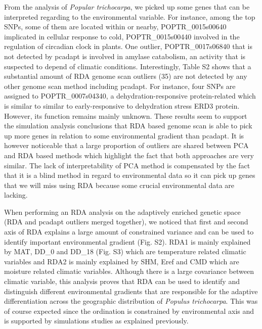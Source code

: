 \documentclass[nogrid]{MBE}%
\begin{document}
From the analysis of \textit{Popular trichocarpa}, we picked up some genes that can be interpreted regarding to the environmental variable. For instance, among the top SNPs, some of them are located within or nearby, POPTR\_0015s00640 implicated in cellular response to cold, POPTR\_0015s00440 involved in the regulation of circadian clock in plants. One outlier, POPTR\_0017s06840 that is not detected by pcadapt is involved in amylase catabolism, an activity that is suspected to depend of climatic conditions. Interestingly, Table S2 shows that a substantial amount of RDA genome scan outliers (35) are not detected by any other genome scan method including pcadapt. For instance, four SNPs are assigned to POPTR\_0007s04340, a dehydration-responsive protein-related which is similar to similar to early-responsive to dehydration stress ERD3 protein. However, its function remains mainly unknown. These results seem to support the simulation analysis conclusions that RDA based genome scan is able to pick up more genes in relation to some environmental gradient than pcadapt. It is however noticeable that a large proportion of outliers are shared between PCA and RDA based methods which highlight the fact that both approaches are very similar. The lack of interpretability of PCA method is compensated by the fact that it is a blind method in regard to environmental data so it can pick up genes that we will miss using RDA because some crucial environmental data are lacking.

When performing an RDA analysis on the adaptively enriched genetic space (RDA and pcadapt outliers merged together), we noticed that first and second axis of RDA explains a large amount of constrained variance and can be used to identify important environmental gradient (Fig. S2). RDA1 is mainly explained by MAT, DD\_0 and DD\_18 (Fig. S3) which are temperature related climatic variables and RDA2 is mainly explained by SHM, Eref and CMD which are moisture related climatic variables. Although there is a large covariance between climatic variable, this analysis proves that RDA can be used to identify and distinguish different environmental gradients that are responsible for the adaptive differentiation across the geographic distribution of \textit{Populus trichocarpa}. This was of course expected since the ordination is constrained by environmental axis and is supported by simulations studies as explained previously.
\end{document}
